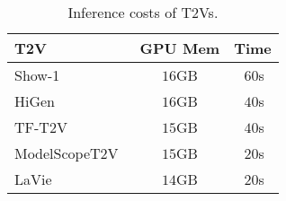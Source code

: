 \begin{table}[!h]
    \centering
    \begin{tabular}{lcc}
        \toprule[1pt]
        \textbf{T2V}      & \textbf{GPU Mem}      & \textbf{Time} \\ 
        \hline
        Show-1~\cite{zhang2023show1marryingpixellatent}      & $16$GB     & $~60$s     \\
        HiGen~\cite{higen}       & $16$GB     & $~40$s     \\
        TF-T2V~\cite{TFT2V}      & $15$GB     & $~40$s     \\
        ModelScopeT2V~\cite{wang2023modelscopetexttovideotechnicalreport}  & $15$GB  & $~20$s     \\
        LaVie~\cite{wang2023laviehighqualityvideogeneration}       & $14$GB     & $~20$s     \\
        \bottomrule[1pt]
    \end{tabular}
    \caption{Inference costs of T2Vs.}
    \label{tab::infer_time_t2v}
\end{table}
